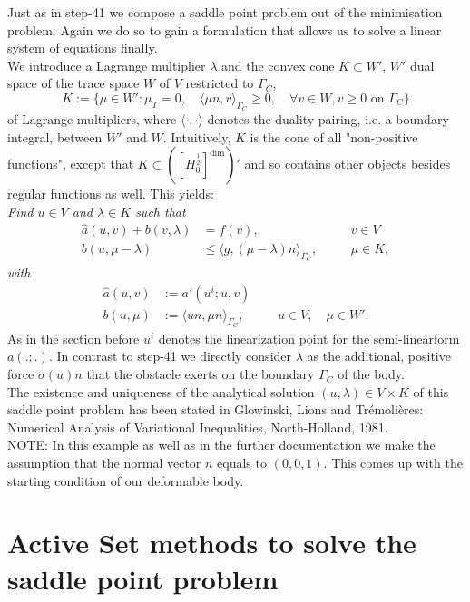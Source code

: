 \documentclass{article}
\begin{document}
Just as in step-41 we compose a saddle point problem out of the minimisation
problem. Again we do so to gain a formulation that allows us to solve a linear
system of equations finally.\\
We introduce a Lagrange multiplier $\lambda$ and the convex cone $K\subset W'$,
$W'$ dual space of the trace space $W$ of $V$ restricted to $\Gamma_C$,
$$K:=\{\mu\in W':\mu_T = 0,\quad\langle\mu n,v\rangle_{\Gamma_C}\geq 0,\quad
\forall v\in W, v \ge 0\text{ on }\Gamma_C \}$$
of Lagrange multipliers, where $\langle\cdot,\cdot\rangle$
denotes the duality pairing, i.e. a boundary integral, between $W'$ and $W$.
Intuitively, $K$ is the cone of all "non-positive functions", except that $ K\subset
\left( \left[ H_0^{\frac{1}{2}} \right]^{\textrm{dim}} \right)' $ and so contains other
objects besides regular functions as well. This yields:\\

\noindent
\textit{Find $u\in V$ and $\lambda\in K$ such that}
\begin{align*}
 \hat{a}(u,v) + b(v,\lambda) &= f(v),\quad &&v\in V\\
 b(u,\mu - \lambda) &\leq \langle g,(\mu -
 \lambda)n\rangle_{\Gamma_C},\quad&&\mu\in K,
\end{align*}
\textit{with}
\begin{align*}
 \hat{a}(u,v) &:= a'(u^i;u,v)\\
 b(u,\mu) &:= \langle un,\mu n\rangle_{\Gamma_C},\quad &&u\in V,\quad\mu\in W'.
\end{align*}
As in the section before $u^i$ denotes the linearization point for the
semi-linearform $a(.;.)$. In contrast to step-41 we directly consider $\lambda$
as the additional, positive force $\sigma(u)n$ that the obstacle
exerts on the boundary $\Gamma_C$ of the body.\\

\noindent
The existence and uniqueness of the analytical solution $(u,\lambda)\in V\times
K$ of this saddle point problem has been stated in Glowinski, Lions and Tr\'{e}moli\`{e}res: Numerical
Analysis of Variational Inequalities, North-Holland, 1981.\\

\noindent
NOTE: In this example as well as in the further documentation we make the
assumption that the normal vector $n$ equals to $(0,0,1)$. This comes up with
the starting condition of our deformable body.

\section{Active Set methods to solve the saddle point problem}
\end{document}
